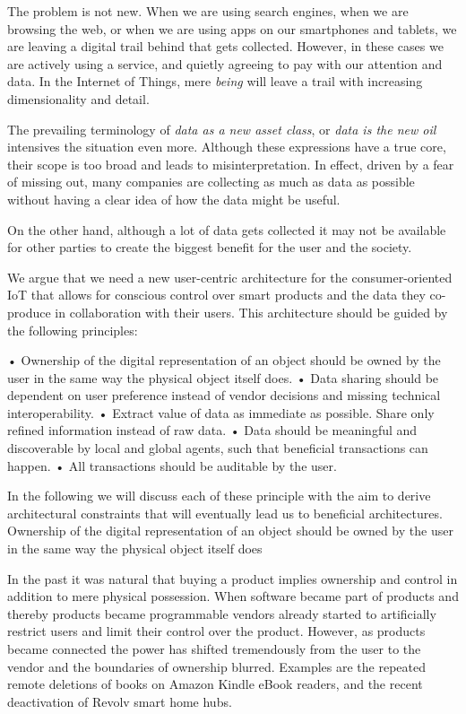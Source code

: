 The problem is not new.  When we are using search engines, when we are browsing the web, or when we are using apps on our smartphones and tablets, we are leaving a digital trail behind that gets collected. However, in these cases we are actively using a service, and quietly agreeing to pay with our attention and data. In the Internet of Things, mere \emph{being} will leave a trail with increasing dimensionality and detail.  

The prevailing terminology of \emph{data as a new asset class}, or \emph{data is the new oil} intensives the situation even more. Although these expressions have a true core, their scope is too broad and leads to misinterpretation. In effect, driven by a fear of missing out, many companies are collecting as much as data as possible without having a clear idea of how the data might be useful. 

On the other hand, although a lot of data gets collected it may not be available for other parties to create the biggest benefit for the user and the society. 

We argue that we need a new user-centric architecture for the consumer-oriented IoT that allows for conscious control over smart products and the data they co-produce in collaboration with their users. This architecture should be guided by the following principles:

\begin{itemize}

•	Ownership of the digital representation of an object should be owned by the user in the same way the physical object itself does.
•	Data sharing should be dependent on user preference instead of vendor decisions and missing technical interoperability.
•	Extract value of data as immediate as possible. Share only refined information instead of raw data.
•	Data should be meaningful and discoverable by local and global agents, such that beneficial transactions can happen.
•	All transactions should be auditable by the user.

\end{itemize}

In the following we will discuss each of these principle with the aim to derive architectural constraints that will eventually lead us to beneficial architectures.
Ownership of the digital representation of an object should be owned by the user in the same way the physical object itself does

In the past it was natural that buying a product implies ownership and control in addition to mere physical possession. When software became part of products and thereby products became programmable vendors already started to artificially restrict users and limit their control over the product. However, as products became connected the power has shifted tremendously from the user to the vendor and the boundaries of ownership blurred. Examples are the repeated remote deletions of books on Amazon Kindle eBook readers, and the recent deactivation of Revolv smart home hubs. 

